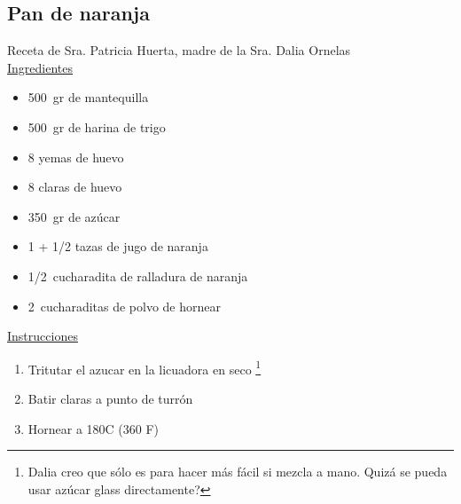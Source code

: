 \subsection{Pan de naranja}

Receta de Sra. Patricia Huerta, madre de la Sra. Dalia Ornelas\\

\underline{Ingredientes} 
\begin{itemize}
\item \SI{500}{gr} de mantequilla
\item \SI{500}{gr} de harina de trigo
\item 8 yemas  de huevo
\item 8 claras de huevo
\item \SI{350}{gr} de azúcar
\item 1 + \num{1/2} tazas de jugo de naranja
\item \SI{1/2}{cucharadita} de ralladura de naranja
\item \SI{2}{cucharaditas} de polvo de hornear
\end{itemize}

\underline{Instrucciones}
\begin{enumerate}
\item Tritutar el azucar en la licuadora en seco \footnote{Dalia creo que sólo es para hacer más fácil si mezcla a mano. Quizá se pueda usar azúcar glass directamente?}
\item Batir claras a punto de turrón
\item Hornear a 180C (360 F)
\end{enumerate}